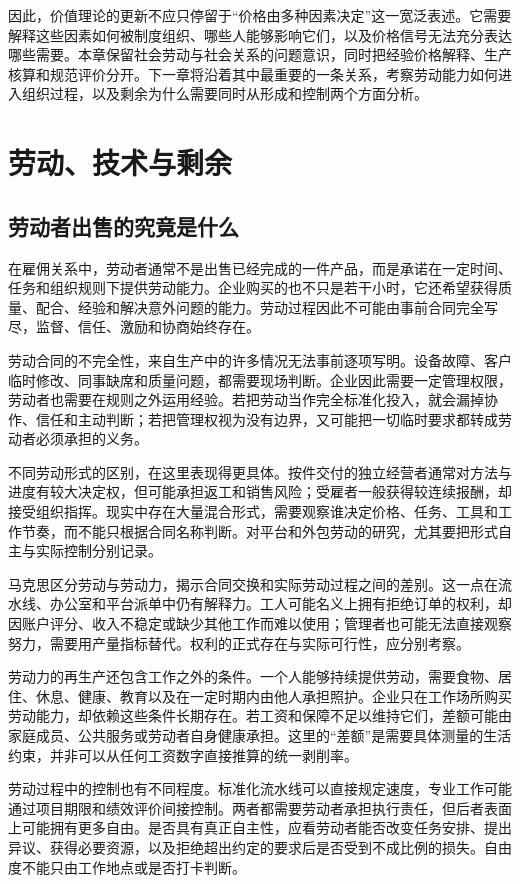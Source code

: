 \documentclass[UTF8,fontset=fandol,zihao=-4,oneside,openany]{ctexbook}
\begin{document}
因此，价值理论的更新不应只停留于“价格由多种因素决定”这一宽泛表述。它需要解释这些因素如何被制度组织、哪些人能够影响它们，以及价格信号无法充分表达哪些需要。本章保留社会劳动与社会关系的问题意识，同时把经验价格解释、生产核算和规范评价分开。下一章将沿着其中最重要的一条关系，考察劳动能力如何进入组织过程，以及剩余为什么需要同时从形成和控制两个方面分析。

\chapter{劳动、技术与剩余}
\section{劳动者出售的究竟是什么}
在雇佣关系中，劳动者通常不是出售已经完成的一件产品，而是承诺在一定时间、任务和组织规则下提供劳动能力。企业购买的也不只是若干小时，它还希望获得质量、配合、经验和解决意外问题的能力。劳动过程因此不可能由事前合同完全写尽，监督、信任、激励和协商始终存在。

\label{arg:P056}
劳动合同的不完全性，来自生产中的许多情况无法事前逐项写明。设备故障、客户临时修改、同事缺席和质量问题，都需要现场判断。企业因此需要一定管理权限，劳动者也需要在规则之外运用经验。若把劳动当作完全标准化投入，就会漏掉协作、信任和主动判断；若把管理权视为没有边界，又可能把一切临时要求都转成劳动者必须承担的义务。

不同劳动形式的区别，在这里表现得更具体。按件交付的独立经营者通常对方法与进度有较大决定权，但可能承担返工和销售风险；受雇者一般获得较连续报酬，却接受组织指挥。现实中存在大量混合形式，需要观察谁决定价格、任务、工具和工作节奏，而不能只根据合同名称判断。对平台和外包劳动的研究，尤其要把形式自主与实际控制分别记录。

马克思区分劳动与劳动力，揭示合同交换和实际劳动过程之间的差别。这一点在流水线、办公室和平台派单中仍有解释力。工人可能名义上拥有拒绝订单的权利，却因账户评分、收入不稳定或缺少其他工作而难以使用；管理者也可能无法直接观察努力，需要用产量指标替代。权利的正式存在与实际可行性，应分别考察。\cite{Marx1}

\label{arg:P057}
劳动力的再生产还包含工作之外的条件。一个人能够持续提供劳动，需要食物、居住、休息、健康、教育以及在一定时期内由他人承担照护。企业只在工作场所购买劳动能力，却依赖这些条件长期存在。若工资和保障不足以维持它们，差额可能由家庭成员、公共服务或劳动者自身健康承担。这里的“差额”是需要具体测量的生活约束，并非可以从任何工资数字直接推算的统一剥削率。

劳动过程中的控制也有不同程度。标准化流水线可以直接规定速度，专业工作可能通过项目期限和绩效评价间接控制。两者都需要劳动者承担执行责任，但后者表面上可能拥有更多自由。是否具有真正自主性，应看劳动者能否改变任务安排、提出异议、获得必要资源，以及拒绝超出约定的要求后是否受到不成比例的损失。自由度不能只由工作地点或是否打卡判断。
\end{document}
